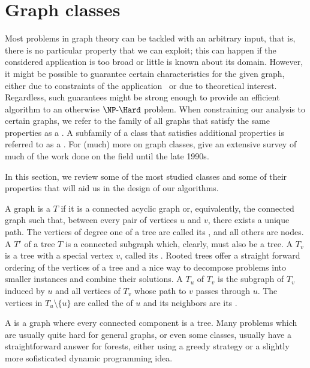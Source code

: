 \section{Graph classes}
\label{sec:graph_classes}

Most problems in graph theory can be tackled with an arbitrary input, that is, there is no particular property that we can exploit; this can happen if the considered application is too broad or little is known about its domain.
However, it might be possible to guarantee certain characteristics for the given graph, either due to constraints of the application~\citep{fernando_chordal} or due to theoretical interest.
Regardless, such guarantees might be strong enough to provide an efficient algorithm to an otherwise $\NPH$ problem.
When constraining our analysis to certain graphs, we refer to the family of all graphs that satisfy the same properties as a .
A subfamily of a class that satisfies additional properties is referred to as a .
For (much) more on graph classes, \cite{classes_survey} give an extensive survey of much of the work done on the field until the late 1990s.

In this section, we review some of the most studied classes and some of their properties that will aid us in the design of our algorithms.

A graph is a  $T$ if it is a connected acyclic graph or, equivalently, the connected graph such that, between every pair of vertices $u$ and $v$, there exists a unique path.
The vertices of degree one of a tree are called its , and all others are  nodes. A  $T'$ of a tree $T$ is a connected subgraph which, clearly, must also be a tree.
A  $T_v$ is a tree with a special vertex $v$, called its .
Rooted trees offer a straight forward ordering of the vertices of a tree and a nice way to decompose problems into smaller instances and combine their solutions.
A  $T_u$ of $T_v$ is the subgraph of $T_v$ induced by $u$ and all vertices of $T_v$ whose path to $v$ passes through $u$.
The vertices in $T_u \setminus \{u\}$ are called the  of $u$ and its neighbors are its .

A  is a graph where every connected component is a tree.
Many problems which are usually quite hard for general graphs, or even some classes, usually have a straightforward answer for forests, either using a greedy strategy or a slightly more sofisticated dynamic programming idea.

